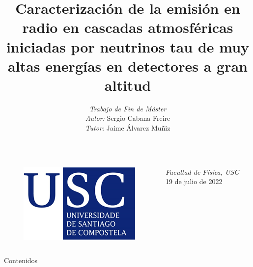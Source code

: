 \documentclass{beamer}
\title[]{Caracterización de la emisión en radio en cascadas atmosféricas iniciadas por
neutrinos tau de muy altas energías en detectores a gran altitud}
\author[USC. Curso 2021/22]{\textit{Trabajo de Fin de Máster}\vspace{5mm}\\\textit{Autor:} Sergio Cabana Freire\vspace{5mm}\\\textit{Tutor:} Jaime Álvarez Muñiz}
\date[Trabajo Fin de Máster]{}
\begin{document}
	\begin{frame}
		\titlepage
		\vspace{-15mm}
		\begin{columns}
		\begin{figure}[H]
		\centering
		\includegraphics[width=.45\linewidth]{figures/USC}
		\end{figure}
		\begin{center}
		\textit{Facultad de Física, USC}
		\vspace{5mm}\\
		19 de julio de 2022
		\end{center}
		\end{columns}
	\end{frame}
	
	\begin{frame}{Contenidos}
		\tableofcontents
	\end{frame}
\end{document}
